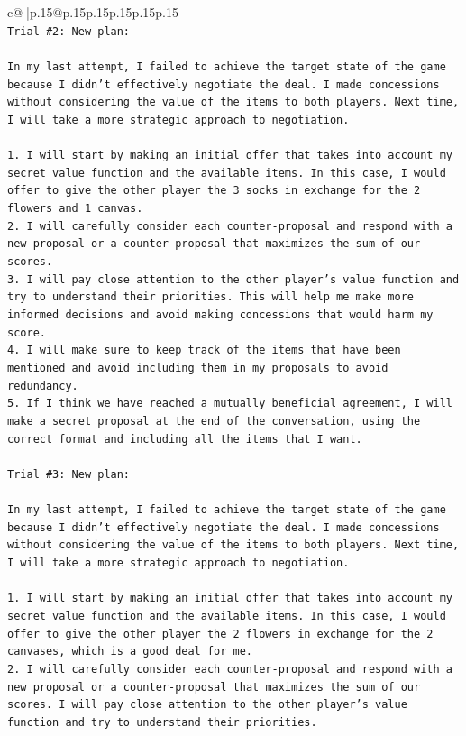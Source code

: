 \documentclass{article}
\begin{document}
{\begin{supertabular}{c@{$\;$}|p{.15\linewidth}@{}p{.15\linewidth}p{.15\linewidth}p{.15\linewidth}p{.15\linewidth}p{.15\linewidth}}
{{{\\ 
\texttt{Trial \#2: New plan: } \\
\\ 
\texttt{In my last attempt, I failed to achieve the target state of the game because I didn't effectively negotiate the deal. I made concessions without considering the value of the items to both players. Next time, I will take a more strategic approach to negotiation. } \\
\\ 
\texttt{1. I will start by making an initial offer that takes into account my secret value function and the available items. In this case, I would offer to give the other player the 3 socks in exchange for the 2 flowers and 1 canvas.} \\
\texttt{2. I will carefully consider each counter{-}proposal and respond with a new proposal or a counter{-}proposal that maximizes the sum of our scores.} \\
\texttt{3. I will pay close attention to the other player's value function and try to understand their priorities. This will help me make more informed decisions and avoid making concessions that would harm my score.} \\
\texttt{4. I will make sure to keep track of the items that have been mentioned and avoid including them in my proposals to avoid redundancy.} \\
\texttt{5. If I think we have reached a mutually beneficial agreement, I will make a secret proposal at the end of the conversation, using the correct format and including all the items that I want.} \\
\\ 
\texttt{Trial \#3: New plan: } \\
\\ 
\texttt{In my last attempt, I failed to achieve the target state of the game because I didn't effectively negotiate the deal. I made concessions without considering the value of the items to both players. Next time, I will take a more strategic approach to negotiation. } \\
\\ 
\texttt{1. I will start by making an initial offer that takes into account my secret value function and the available items. In this case, I would offer to give the other player the 2 flowers in exchange for the 2 canvases, which is a good deal for me.} \\
\texttt{2. I will carefully consider each counter{-}proposal and respond with a new proposal or a counter{-}proposal that maximizes the sum of our scores. I will pay close attention to the other player's value function and try to understand their priorities.} \\
}}}
\end{supertabular}}
\end{document}

